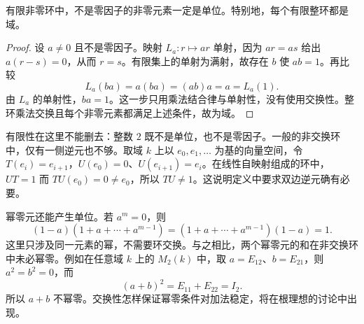 \begin{proposition}\label{b1:prop:finite-domain-field}
	有限非零环中，不是零因子的非零元素一定是单位。特别地，每个有限整环都是域。
\end{proposition}
\begin{proof}
	设 \(a\ne0\) 且不是零因子。映射 \(L_a:r\mapsto ar\) 单射，因为 \(ar=as\) 给出 \(a(r-s)=0\)，从而 \(r=s\)。有限集上的单射为满射，故存在 \(b\) 使 \(ab=1\)。再比较
	\[
		L_a(ba)=a(ba)=(ab)a=a=L_a(1).
	\]
	由 \(L_a\) 的单射性，\(ba=1\)。这一步只用乘法结合律与单射性，没有使用交换性。整环乘法交换且每个非零元素都满足上述条件，故为域。
\end{proof}
有限性在这里不能删去：整数 \(2\) 既不是单位，也不是零因子。一般的非交换环中，仅有一侧逆元也不够。取域 \(k\) 上以 \(e_0,e_1,\ldots\) 为基的向量空间，令 \(T(e_i)=e_{i+1}\)，\(U(e_0)=0\)、\(U(e_{i+1})=e_i\)。在线性自映射组成的环中，\(UT=1\) 而 \(TU(e_0)=0\ne e_0\)，所以 \(TU\ne1\)。这说明定义中要求双边逆元确有必要。

\ProseParagraphBreak
幂零元还能产生单位。若 \(a^m=0\)，则
\[
	(1-a)(1+a+\cdots+a^{m-1}) =(1+a+\cdots+a^{m-1})(1-a)=1.
\]
这里只涉及同一元素的幂，不需要环交换。与之相比，两个幂零元的和在非交换环中未必幂零。例如在任意域 \(k\) 上的 \(M_2(k)\) 中，取 \(a=E_{12}\)、\(b=E_{21}\)，则 \(a^2=b^2=0\)，而
\[
	(a+b)^2=E_{11}+E_{22}=I_2.
\]
所以 \(a+b\) 不幂零。交换性怎样保证幂零条件对加法稳定，将在根理想的讨论中出现。
